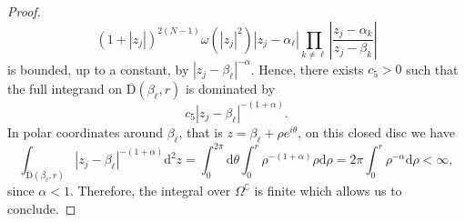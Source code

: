 \documentclass[10pt,a4paper]{amsart}
\begin{document}
\begin{proof}
    \begin{equation*}
        (1+\left|z_{j}\right|)^{2(N-1)}\omega(\left|z_{j}\right|^{2})\left|z_{j}-\alpha_{\ell}\right|\prod\limits_{k\neq\ell}^{}\left|\frac{z_{j}-\alpha_{k}}{z_{j}-\beta_{k}}\right|
    \end{equation*}
    is bounded, up to a constant, by $\left|z_{j}-\beta_{\ell}\right|^{-\alpha}$. Hence, there exists $c_{5}>0$ such that the full integrand on $\overline{\mathrm{D}}(\beta_{\ell},r)$ is dominated by
    \begin{equation*}
        c_{5}\left|z_{j}-\beta_{\ell}\right|^{-(1+\alpha)}.
    \end{equation*}
    In polar coordinates around $\beta_{\ell}$, that is $z=\beta_{\ell}+\rho e^{i\theta}$, on this closed disc we have
    \begin{equation*}
        \int_{\overline{\mathrm{D}}(\beta_{\ell},r)}\left|z_{j}-\beta_{\ell}\right|^{-(1+\alpha)}\mathrm{d}^{2}z=\int_{0}^{2\pi}\mathrm{d}\theta\int_{0}^{r}\rho^{-(1+\alpha)}\rho\mathrm{d}\rho=2\pi\int_{0}^{r}\rho^{-\alpha}\mathrm{d}\rho <\infty,
    \end{equation*}
    since $\alpha<1$. Therefore, the integral over $\Omega^{\complement}$ is finite which allows us to conclude.
    
\end{proof}
\end{document}
